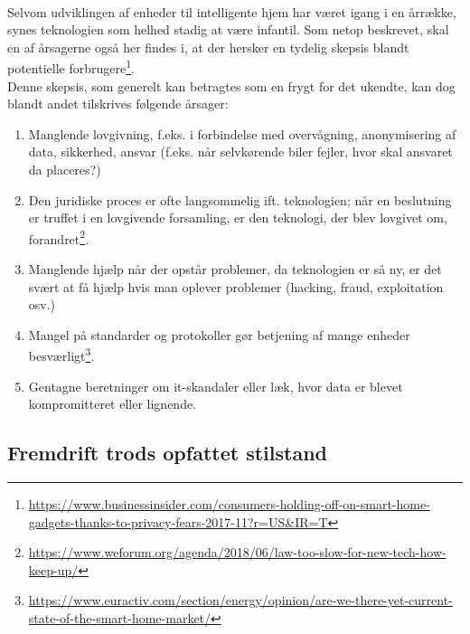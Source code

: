 \documentclass{article}
\begin{document}
\paragraph{}
Selvom udviklingen af enheder til intelligente hjem har været igang i en årrække, synes teknologien som helhed stadig at være infantil.
Som netop beskrevet, skal en af årsagerne også her findes i, at der hersker en tydelig skepsis blandt potentielle forbrugere\footnote{\url{https://www.businessinsider.com/consumers-holding-off-on-smart-home-gadgets-thanks-to-privacy-fears-2017-11?r=US\&IR=T}}.\\
Denne skepsis, som generelt kan betragtes som en frygt for det ukendte, kan dog blandt andet tilskrives følgende årsager:
\begin{enumerate}
    \item Manglende lovgivning, f.eks. i forbindelse med overvågning, anonymisering af data, sikkerhed, ansvar (f.eks. når selvkørende biler fejler, hvor skal ansvaret da placeres?)
    \item Den juridiske proces er ofte langsommelig ift. teknologien; når en beslutning er truffet i en lovgivende forsamling, er den teknologi, der blev lovgivet om, forandret\footnote{\url{https://www.weforum.org/agenda/2018/06/law-too-slow-for-new-tech-how-keep-up/}}.
    \item Manglende hjælp når der opstår problemer, da teknologien er så ny, er det svært at få hjælp hvis man oplever problemer (hacking, fraud, exploitation osv.)
    \item Mangel på standarder og protokoller gør betjening af mange enheder besværligt\footnote{\url{https://www.euractiv.com/section/energy/opinion/are-we-there-yet-current-state-of-the-smart-home-market/}}.
    \item Gentagne beretninger om it-skandaler eller læk, hvor data er blevet kompromitteret eller lignende.
\end{enumerate} 
\subsection{Fremdrift trods opfattet stilstand}
\end{document}
